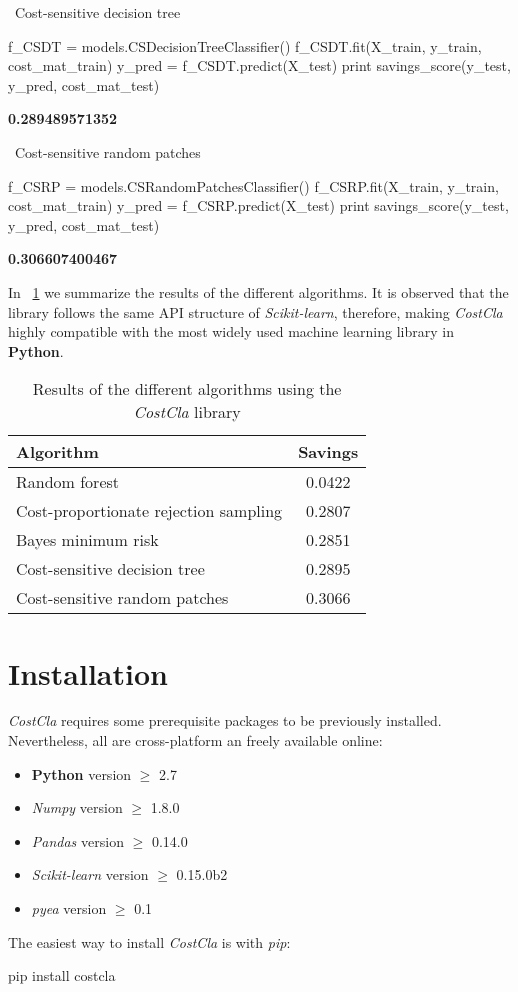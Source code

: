 \vskip0.3cm
\noindent \textbullet\ Cost-sensitive decision tree

\vskip0.3cm
\begin{pythoncode}
f_CSDT = models.CSDecisionTreeClassifier()
f_CSDT.fit(X_train, y_train, cost_mat_train)
y_pred = f_CSDT.predict(X_test)
print savings_score(y_test, y_pred, cost_mat_test)
\end{pythoncode}
\textbf{0.289489571352}

\vskip0.3cm
\noindent \textbullet\ Cost-sensitive random patches

\vskip0.3cm
\begin{pythoncode}
f_CSRP = models.CSRandomPatchesClassifier()
f_CSRP.fit(X_train, y_train, cost_mat_train)
y_pred = f_CSRP.predict(X_test)
print savings_score(y_test, y_pred, cost_mat_test)
\end{pythoncode}
\textbf{0.306607400467}

\vskip0.3cm
In \tablename{~\ref{tab:9:1}} we summarize the results of the different 
algorithms. It is observed that the library follows the same API structure of 
\textit{Scikit-learn}, therefore, making \textit{CostCla} highly compatible with the most widely 
used machine learning library in \textbf{Python}.

\begin{table}[htbp]
    \centering
    \footnotesize
    \begin{tabular}{l|c}
      Algorithm & Savings \\
      \hline
      Random forest & 0.0422 \\
      Cost-proportionate rejection sampling & 0.2807\\
      Bayes minimum risk & 0.2851\\
      Cost-sensitive decision tree & 0.2895\\
      Cost-sensitive random patches & 0.3066\\   
    \end{tabular}
    \caption{Results of the different algorithms using the \textit{CostCla} library}
    \label{tab:9:1}
  \end{table}  

\newpage
\section{Installation}

\textit{CostCla} requires some prerequisite packages to be previously installed. Nevertheless, all 
are cross-platform an freely available online:
\begin{itemize}
 \item \textbf{Python} version $\ge$ 2.7
 \item \textit{Numpy} version $\ge$ 1.8.0
 \item \textit{Pandas} version $\ge$ 0.14.0
 \item \textit{Scikit-learn} version $\ge$ 0.15.0b2
 \item \textit{pyea} version $\ge$ 0.1
\end{itemize}

\noindent The easiest way to install \textit{CostCla}  is with \textit{pip}:
\vskip0.3cm
\begin{pythoncode}
pip install costcla
\end{pythoncode}



